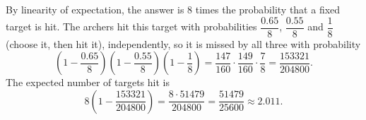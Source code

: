 By linearity of expectation, the answer is $8$ times the probability that a fixed target is hit. The archers hit this target with probabilities $\dfrac{0.65}{8}$, $\dfrac{0.55}{8}$ and $\dfrac18$ (choose it, then hit it), independently, so it is missed by all three with probability
\[\left(1-\dfrac{0.65}{8}\right)\left(1-\dfrac{0.55}{8}\right)\left(1-\dfrac18\right)=\dfrac{147}{160}\cdot\dfrac{149}{160}\cdot\dfrac78=\dfrac{153321}{204800}.\]
The expected number of targets hit is
\[8\left(1-\dfrac{153321}{204800}\right)=\dfrac{8\cdot51479}{204800}=\boxed{\dfrac{51479}{25600}}\approx2.011.\]
